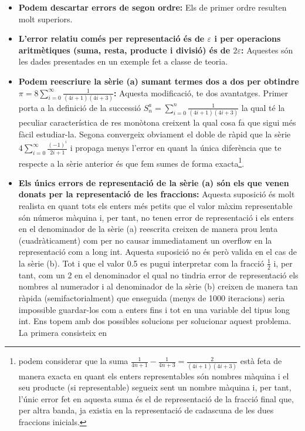 \documentclass[a4paper,10pt]{article}
\renewcommand{\*}{\cdot}
\renewcommand{\epsilon}{\varepsilon}
\begin{document}
\begin{itemize}
 \item \textbf{Podem descartar errors de segon ordre:} Els de primer ordre resulten molt superiors.
 \item \textbf{L'error relatiu comés per representació és de $\epsilon$  i per operacions aritmètiques (suma, resta, producte i divisió) és de $2\epsilon$:} Aquestes són les
 dades presentades en un exemple fet a classe de teoria.
 \item \textbf{Podem reescriure la sèrie (a) sumant termes dos a dos per obtindre $\pi=8\sum\limits_{i=0}^{\infty}\frac{1}{(4i+1)(4i+3)}$:} Aquesta modificació, te dos
 avantatges. Primer porta a la definició de la successió $S_n^a=\sum\limits_{i=0}^n\frac{1}{(4i+1)(4i+3)}$ la qual té la peculiar característica de res monòtona creixent la 
 qual cosa fa que sigui més fàcil estudiar-la. Segona convergeix obviament el doble de ràpid que la sèrie $4\sum_{i=0}^{\infty}\frac{(-1)^i}{2i+1}$ i propaga menys l'error
 en quant la única diferència que te respecte a la sèrie anterior és que fem sumes de forma exacta\footnote{podem considerar que la suma 
 $\frac{1}{4n+1}-\frac{1}{4n+3}=\frac{2}{(4i+1)(4i+3)}$ està feta de manera exacta en quant els enters representables són nombres màquina i el seu producte 
 (si representable) segueix sent un nombre màquina i, per tant, l'únic error fet en aquesta suma és el de representació de la fracció final que, per altra banda, ja existia
 en la representació de cadascuna de les dues fraccions inicials.}.
 \item \textbf{Els únics errors de representació de la sèrie (a) són els que venen donats per la representació de les fraccions:} Aquesta suposició és molt realista en quant
 tots els enters més petits que el valor màxim representable són números màquina i, per tant, no tenen error de representació i els enters en el denominador de la sèrie (a)
 reescrita creixen de manera prou lenta (cuadràticament) com per no causar immediatament un overflow en la representació com a long int. Aquesta suposició no és però valida en el cas de
 la sèrie (b). Tot i que el valor 0.5 es pugui interpretar com la fracció $\frac{1}{2}$ i,  per tant, com un 2 en el denominador el qual no tindria error de representació
 els nombres al numerador i al denominador de la sèrie (b) creixen de manera tan ràpida (semifactorialment) que enseguida (menys de 1000 iteracions) seria impossible
 guardar-los com a enters fins i tot en una variable del tipus long int. Ens topem amb dos possibles solucions per solucionar aquest problema. La primera consisteix en 

\end{itemize}
\end{document}
